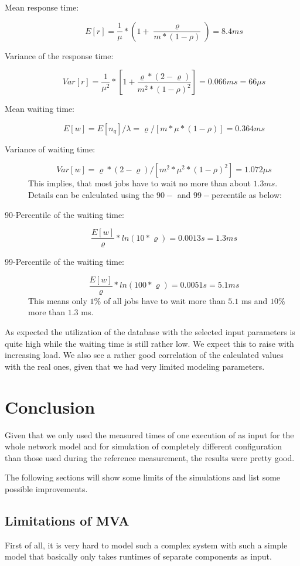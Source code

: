 \documentclass[a4paper, oneside]{csthesis}
\begin{document}
\begin{description}
\item[Mean response time:]
\[
E[r] = \frac{1}{\mu} * (1 + \frac{\varrho}{m * (1 - \rho)}) = 8.4 ms
\]

\item[Variance of the response time:]
\[
Var[r] = \frac{1}{\mu^2} * \left[1 + \frac{\varrho * (2 -
\varrho)}{m^2*(1 - \rho)^2}\right] = 0.066 ms = 66 \mu s
\]

\item[Mean waiting time:]
\[
E[w] = E[n_q]/\lambda = \varrho / [m * \mu * (1 - \rho)] = 0.364 ms
\]

\item[Variance of waiting time:]
\[
Var[w] = \varrho * (2 - \varrho)/[m^2 * \mu^2 * (1 - \rho)^2] = 1.072 \mu s
\]
This implies, that most jobs have to wait no more than about $1.3 ms$. Details
can be calculated using the $90-$ and $99-$percentile as below:

\item[90-Percentile of the waiting time:]
\[
\frac{E[w]}{\varrho} * ln(10 * \varrho) = 0.0013 s = 1.3 ms
\]

\item[99-Percentile of the waiting time:]
\[
\frac{E[w]}{\varrho} * ln(100 * \varrho) = 0.0051 s = 5.1 ms
\]
This means only $1 \%$ of all jobs have to wait more than $5.1$ ms and $10 \%$
more than $1.3$ ms.

\end{description}

As expected the utilization of the database with the selected input parameters
is quite high while the waiting time is still rather low. We expect this to
raise with increasing load. We also see a rather good correlation of the
calculated values with the real ones, given that we had very limited modeling
parameters.

\chapter{Conclusion}
	\label{ch:conclusion}
	
	Given that we only used the measured times of one execution of \telesto{} as
    input for the whole network model and for simulation of completely different
    configuration than those used during the reference measurement, the results
    were pretty good.
    
    The following sections will show some limits of the simulations and list
    some possible improvements.
	
\section{Limitations of MVA}
    First of all, it is very hard to model such a complex system with such a
    simple model that basically only takes runtimes of separate components as
    input. 
    
\end{document}
